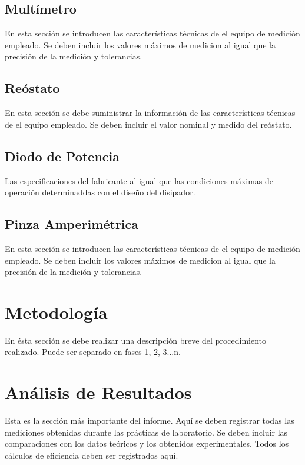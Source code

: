 \documentclass[letterpaper, 12pt]{report}
\begin{document}
\subsection{Mult\'imetro}

En esta secci\'on se introducen las caracter\'isticas t\'ecnicas de el equipo de medici\'on empleado. Se deben incluir los valores m\'aximos de medicion al igual que la precisi\'on de la medici\'on y tolerancias. 

\subsection{Re\'ostato}

En esta secci\'on se debe suministrar la informaci\'on de las caracter\'isticas t\'ecnicas de el equipo empleado. Se deben incluir el valor nominal y medido del re\'ostato. 

\subsection{Diodo de Potencia}

Las especificaciones del fabricante al igual que las condiciones m\'aximas de operaci\'on determinaddas con el dise\~no del disipador.  

\subsection{Pinza Amperim\'etrica}

En esta secci\'on se introducen las caracter\'isticas t\'ecnicas de el equipo de medici\'on empleado. Se deben incluir los valores m\'aximos de medicion al igual que la precisi\'on de la medici\'on y tolerancias. 

\newpage

\section{Metodolog\'ia}

En \'esta secci\'on se debe realizar una descripci\'on breve del procedimiento realizado. Puede ser separado en fases 1, 2, 3...n. 

\newpage

\section{An\'alisis de Resultados}
Esta es la secci\'on m\'as importante del informe. Aqu\'i se deben registrar todas las mediciones obtenidas durante las pr\'acticas de laboratorio. Se deben incluir las comparaciones con los datos te\'oricos y los obtenidos experimentales. Todos los c\'alculos de eficiencia deben ser registrados aqu\'i. 
\end{document}
